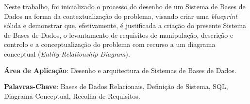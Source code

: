 \documentclass[a4paper,12pt]{scrreprt}
\begin{document}


\makecover



    
    






\renewenvironment{abstract}
 {\par\noindent\textbf{\Large\abstractname}\par\bigskip}
 {}

\begin{flushleft}
\begin{abstract}
    Neste trabalho, foi inicializado o processo do desenho de um Sistema de Bases de Dados na forma da
    contextualiza\c{c}\~ao do problema, visando criar uma \textit{blueprint} s\'olida e demonstrar que, efetivamente,
    \'e justificada a cria\c{c}\~ao do presente Sistema de Bases de Dados,
    o levantamento de requisitos de manipulação, descrição e controlo e a conceptualização do
    problema com recurso a um diagrama conceptual (\textit{Entity-Relationship Diagram}).
    \par \textbf{\'Area de Aplicação}: Desenho e arquitectura de Sistemas de Bases de Dados.
    \par \textbf{Palavras-Chave}: Bases de Dados Relacionais, Defini\c{c}\~ao de Sistema, SQL, Diagrama Conceptual,
    Recolha de Requisitos.
\end{abstract}
\end{flushleft}
\end{document}

